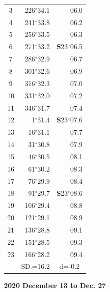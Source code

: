 \documentclass[10pt, a4paper]{report}
\begin{document}
\begin{scriptsize}
\begin{tabular*}{0.2\textwidth}[t]{@{\extracolsep{\fill}}|c|rr|}
3 & 226$^\circ$34.1 & \raisebox{0.24ex}{\boldmath$\cdot$~\boldmath$\cdot$~~}06.0\\
4 & 241$^\circ$33.8 & 06.2\\
5 & 256$^\circ$33.5 & 06.3\\[2Pt]
6 & 271$^\circ$33.2 & \textbf{S}23$^\circ$06.5\\
7 & 286$^\circ$32.9 & 06.7\\
8 & 301$^\circ$32.6 & 06.9\\
9 & 316$^\circ$32.3 & \raisebox{0.24ex}{\boldmath$\cdot$~\boldmath$\cdot$~~}07.0\\
10 & 331$^\circ$32.0 & 07.2\\
11 & 346$^\circ$31.7 & 07.4\\[2Pt]
12 & 1$^\circ$31.4 & \textbf{S}23$^\circ$07.6\\
13 & 16$^\circ$31.1 & 07.7\\
14 & 31$^\circ$30.8 & 07.9\\
15 & 46$^\circ$30.5 & \raisebox{0.24ex}{\boldmath$\cdot$~\boldmath$\cdot$~~}08.1\\
16 & 61$^\circ$30.2 & 08.3\\
17 & 76$^\circ$29.9 & 08.4\\[2Pt]
18 & 91$^\circ$29.7 & \textbf{S}23$^\circ$08.6\\
19 & 106$^\circ$29.4 & 08.8\\
20 & 121$^\circ$29.1 & 08.9\\
21 & 136$^\circ$28.8 & \raisebox{0.24ex}{\boldmath$\cdot$~\boldmath$\cdot$~~}09.1\\
22 & 151$^\circ$28.5 & 09.3\\
23 & 166$^\circ$28.2 & 09.4\\
\hline
\rule{0pt}{2.4ex} & \multicolumn{1}{c}{SD.=16.2} & \multicolumn{1}{c|}{d=-0.2}\\
\hline
\end{tabular*}

\end{scriptsize}
\newpage
\sffamily
\noindent
\begin{flushright}
\textbf{2020 December 13 to Dec. 27}\par
\end{flushright}
\end{document}

